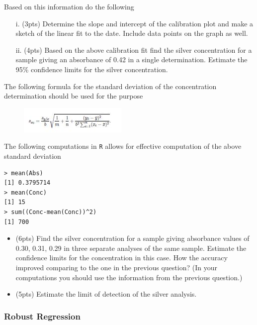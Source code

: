 \documentclass[a4paper,12pt]{article}
\begin{document}
Based on this information do the following
\begin{itemize}
\item[i.] (3pts) Determine the slope and intercept of the calibration plot and make a sketch of the linear fit to
the date. Include data points on the graph as well.
\item[ii.]  (4pts) Based on the above calibration fit find the silver concentration for a sample giving an absorbance
of 0.42 in a single determination. Estimate the 95\% confidence limits for the silver concentration.
\end{itemize}
The following formula for the standard deviation of the concentration determination should be
used for the purpose
\begin{figure}[h!]
\centering
\includegraphics[width=0.5\linewidth]{image/Sample2}
\end{figure}

The following computations in \texttt{R} allows for effective computation of the above standard deviation

\begin{framed}
\begin{verbatim}
> mean(Abs)
[1] 0.3795714
> mean(Conc)
[1] 15
> sum((Conc-mean(Conc))^2)
[1] 700
\end{verbatim}
\end{framed}
\begin{itemize}
\item (6pts) Find the silver concentration for a sample giving absorbance values of 0.30, 0.31, 0.29 in three
separate analyses of the same sample. Estimate the confidence limits for the concentration in
this case. How the accuracy improved comparing to the one in the previous question? (In your
computations you should use the information from the previous question.)
\item (5pts) Estimate the limit of detection of the silver analysis.
\end{itemize}

\subsubsection*{Robust Regression}
\end{document}
